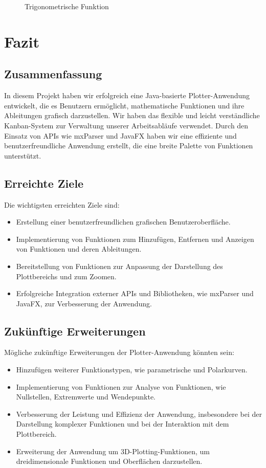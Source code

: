 \documentclass[a4paper]{article}
\begin{document}
\begin{enumerate}
\begin{figure}[ht]
		      \caption{Trigonometrische Funktion}
		      \label{fig:example_trigonometric}
	      \end{figure}
\end{enumerate}

\newpage

\section{Fazit}

\subsection{Zusammenfassung}
In diesem Projekt haben wir erfolgreich eine Java-basierte Plotter-Anwendung entwickelt, die es Benutzern ermöglicht, mathematische Funktionen und ihre Ableitungen grafisch darzustellen. Wir haben das flexible und leicht verständliche Kanban-System zur Verwaltung unserer Arbeitsabläufe verwendet. Durch den Einsatz von APIs wie mxParser und JavaFX haben wir eine effiziente und benutzerfreundliche Anwendung erstellt, die eine breite Palette von Funktionen unterstützt.

\subsection{Erreichte Ziele}
Die wichtigsten erreichten Ziele sind:
\begin{itemize}
	\item Erstellung einer benutzerfreundlichen grafischen Benutzeroberfläche.
	\item Implementierung von Funktionen zum Hinzufügen, Entfernen und Anzeigen von Funktionen und deren Ableitungen.
	\item Bereitstellung von Funktionen zur Anpassung der Darstellung des Plottbereichs und zum Zoomen.
	\item Erfolgreiche Integration externer APIs und Bibliotheken, wie mxParser und JavaFX, zur Verbesserung der Anwendung.
\end{itemize}

\subsection{Zukünftige Erweiterungen}
Mögliche zukünftige Erweiterungen der Plotter-Anwendung könnten sein:
\begin{itemize}
	\item Hinzufügen weiterer Funktionstypen, wie parametrische und Polarkurven.
	\item Implementierung von Funktionen zur Analyse von Funktionen, wie Nullstellen, Extremwerte und Wendepunkte.
	\item Verbesserung der Leistung und Effizienz der Anwendung, insbesondere bei der Darstellung komplexer Funktionen und bei der Interaktion mit dem Plottbereich.
	\item Erweiterung der Anwendung um 3D-Plotting-Funktionen, um dreidimensionale Funktionen und Oberflächen darzustellen.
\end{itemize}
\end{document}
